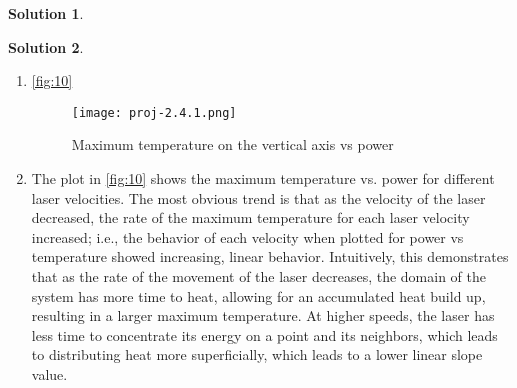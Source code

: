 \documentclass[12pt]{article}
\theoremstyle{definition} %
\newtheorem{solution}{Solution}
\theoremstyle{plain} %
\begin{document}
\begin{solution}
\end{solution}

\begin{solution}
    \noindent
    \begin{enumerate}
        \item \autoref{fig:10} \begin{figure}[htbp]
            \centering
            \texttt{[image: proj-2.4.1.png]}
            \caption{Maximum temperature on the vertical axis vs power}
            \label{fig:10}
        \end{figure}
    \item The plot in \autoref{fig:10} shows the maximum temperature vs. power for different laser velocities. The most obvious trend is that as the velocity of the laser decreased, the rate of the maximum temperature for each laser velocity increased; i.e., the behavior of each velocity when plotted for power vs temperature showed increasing, linear behavior. Intuitively, this demonstrates that as the rate of the movement of the laser decreases, the domain of the system has more time to heat, allowing for an accumulated heat build up, resulting in a larger maximum temperature. 
    At higher speeds, the laser has less time to concentrate its energy on a point and its neighbors, which leads to distributing heat more superficially, which leads to a lower linear slope value. 
    \end{enumerate}

\end{solution}
\end{document}
